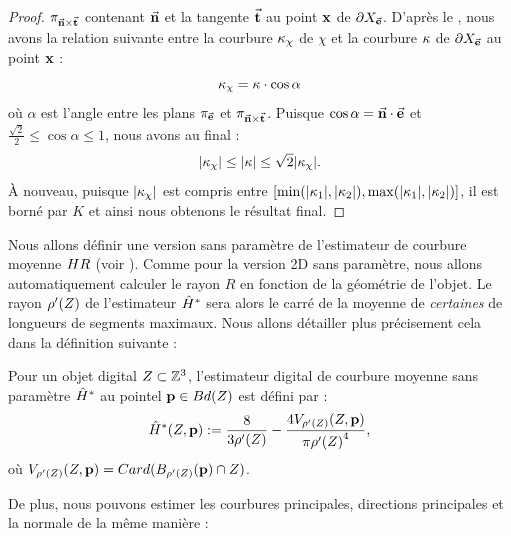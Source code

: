 \begin{proof}
  $\pi_{\vec{\mathbf{n}} \times \vec{\mathbf{t}}}$ contenant $\vec{\mathbf{n}}$ et la
  tangente $\vec{\mathbf{t}}$ au point $\mathbf{x}$ de $\partial X_{\vec{\mathbf{e}}}$. D'après le
  , nous avons la relation suivante entre la
  courbure $\kappa_\chi$ de $\chi$ et la courbure $\kappa$ de $\partial X_{\vec{\mathbf{e}}}$ au
  point $\mathbf{x}$ :
  \begin{equation}
    \kappa_\chi = \kappa \cdot \cos \alpha
  \end{equation}
  où $\alpha$ est l'angle entre les plans $\pi_{\vec{\mathbf{e}}}$ et
  $\pi_{\vec{\mathbf{n}} \times \vec{\mathbf{t}}}$. Puisque $\cos \alpha =
  \vec{\mathbf{n}} \cdot \vec{\mathbf{e}}$ et $\frac{\sqrt{2}}{2} \leq \cos \alpha \leq
  1 $, nous avons au final :
  \begin{equation}
    |\kappa_\chi| \le |\kappa| \le \sqrt{2}|\kappa_\chi|.
  \end{equation}
  À nouveau, puisque  $|\kappa_\chi|$ est compris entre $\lbrack
  \min(|\kappa_{1}|,|\kappa_{2}|),
  \max(|\kappa_{1}|,|\kappa_{2}|)\rbrack$,  il est borné par $K$ et ainsi
  nous obtenons le résultat final.
\end{proof}
%
Nous allons définir une version sans paramètre de l'estimateur de courbure
moyenne $H{R}$ (voir ).
Comme pour la version 2D sans paramètre, nous allons automatiquement calculer le
rayon $R$ en fonction de la géométrie de l'objet. Le rayon $\rho'(Z)$ de
l'estimateur $\hat{H}^{*}$ sera alors le carré de la moyenne de \emph{certaines}
de longueurs de segments maximaux. Nous allons détailler plus précisement cela
dans la définition suivante :
%
\begin{definition}
  Pour un objet digital $Z \subset \mathbb{Z}^3$, l'estimateur digital de
  courbure moyenne sans paramètre $\hat{H}^{*}$ au pointel $\mathbf{p} \in
  Bd({Z})$ est défini par :
  \begin{equation}
    \hat{H}^{*}( Z, \mathbf{p} ) := \frac{8}{3 {\rho'(Z)}} - \frac{4 V_{{\rho'(Z)}}(Z, \mathbf{p})}{\pi{{\rho'(\ensuremath{Z})}}^4} ,
    \label{def:curvature-estimator-3d-mean-pf}
  \end{equation}
  où $V_{\rho'(Z)}(Z, \mathbf{p}) = Card(B_{\rho'(Z)}(\mathbf{p}) \cap Z)$.
\end{definition}
%
De plus, nous pouvons estimer les courbures principales, directions principales
et la normale de la même manière :
%
